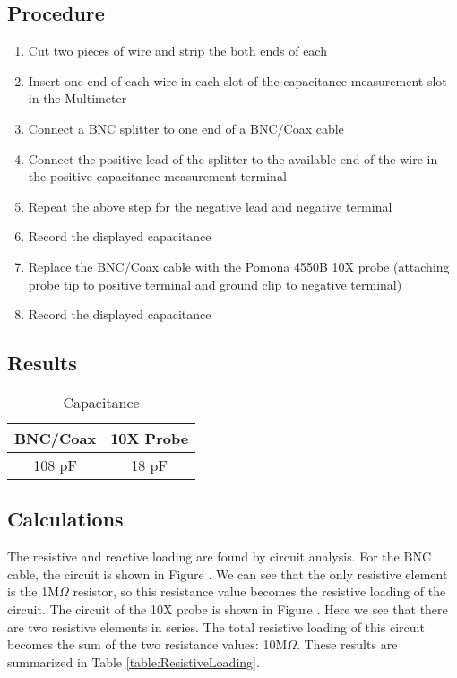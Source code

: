 \documentclass[12pt,letterpaper]{report}
\begin{document}
\subsection*{Procedure}
\begin{enumerate}
	\item Cut two pieces of wire and strip the both ends of each
	\item Insert one end of each wire in each slot of the capacitance measurement slot in the Multimeter
	\item Connect a BNC splitter to one end of a BNC/Coax cable
	\item Connect the positive lead of the splitter to the available end of the wire in the positive capacitance measurement terminal
	\item Repeat the above step for the negative lead and negative terminal
	\item Record the displayed capacitance
	\item Replace the BNC/Coax cable with the Pomona 4550B 10X probe (attaching probe tip to positive terminal and ground clip to negative terminal)
	\item Record the displayed capacitance
\end{enumerate}
\subsection*{Results}
\begin{center}
\begin{table}[ht]
\caption{Capacitance}
\centering
	\begin{tabular}{| c | c |}
	\hline
	
	BNC/Coax & 10X Probe \\
	\hline
	108 pF & 18 pF \\

	\hline
	\end{tabular}
\end{table}
\end{center}

\subsection*{Calculations}
The resistive and reactive loading are found by circuit analysis. For the BNC cable, the circuit is shown in Figure 
. We can see that the only resistive element is the 1M$\Omega$ resistor, so this resistance value becomes the resistive loading of the circuit. The circuit of the 10X probe is shown in Figure 
. Here we see that there are two resistive elements in series. The total resistive loading of this circuit becomes the sum of the two resistance values: 10M$\Omega$. These results are summarized in Table \ref{table:ResistiveLoading}.
\end{document}
